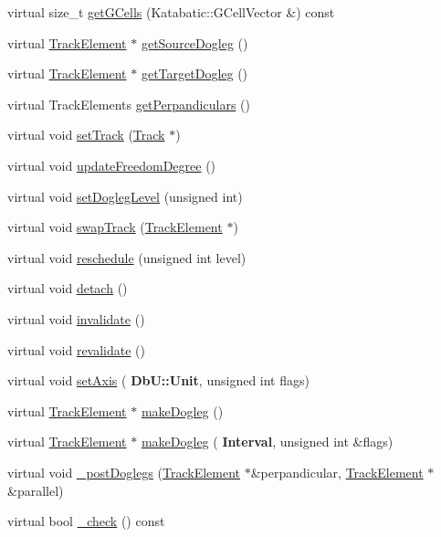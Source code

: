 \begin{DoxyCompactItemize}
\item 
virtual size\+\_\+t \hyperlink{classKite_1_1TrackSegment_af45301f76558f613ccb605a8f851080e}{get\+G\+Cells} (Katabatic\+::\+G\+Cell\+Vector \&) const
\item 
virtual \hyperlink{classKite_1_1TrackElement}{Track\+Element} $\ast$ \hyperlink{classKite_1_1TrackSegment_a7e79fbfe77f173d46b1959c41087930a}{get\+Source\+Dogleg} ()
\item 
virtual \hyperlink{classKite_1_1TrackElement}{Track\+Element} $\ast$ \hyperlink{classKite_1_1TrackSegment_aeb4e39bd925d093e6c45599433bb421c}{get\+Target\+Dogleg} ()
\item 
virtual Track\+Elements \hyperlink{classKite_1_1TrackSegment_aa0ba92ebf19f596537dc051c090d5736}{get\+Perpandiculars} ()
\item 
virtual void \hyperlink{classKite_1_1TrackSegment_abd3d8093f871d3d1a7f24b053648026c}{set\+Track} (\hyperlink{classKite_1_1Track}{Track} $\ast$)
\item 
virtual void \hyperlink{classKite_1_1TrackSegment_af5332d647c0482aa90ad7cc9b2a50f3a}{update\+Freedom\+Degree} ()
\item 
virtual void \hyperlink{classKite_1_1TrackSegment_a2b90319cb042b283aa5d1fdb1992f11f}{set\+Dogleg\+Level} (unsigned int)
\item 
virtual void \hyperlink{classKite_1_1TrackSegment_acc245ce084989d1c34816d0e61b9d510}{swap\+Track} (\hyperlink{classKite_1_1TrackElement}{Track\+Element} $\ast$)
\item 
virtual void \hyperlink{classKite_1_1TrackSegment_a0ffe603ec7d46f21f5e56ccbe84c03fb}{reschedule} (unsigned int level)
\item 
virtual void \hyperlink{classKite_1_1TrackSegment_ac295bade8aee589f6718dfa79edc2a34}{detach} ()
\item 
virtual void \hyperlink{classKite_1_1TrackSegment_a893f1101c650c08c98612515c2b1a89c}{invalidate} ()
\item 
virtual void \hyperlink{classKite_1_1TrackSegment_a5bd93abe1416952ace15a98dbeeed124}{revalidate} ()
\item 
virtual void \hyperlink{classKite_1_1TrackSegment_a262a915c38127d3722ec561b30d80f91}{set\+Axis} (\textbf{ Db\+U\+::\+Unit}, unsigned int flags)
\item 
virtual \hyperlink{classKite_1_1TrackElement}{Track\+Element} $\ast$ \hyperlink{classKite_1_1TrackSegment_a7a9637875364e84e6862de0102341715}{make\+Dogleg} ()
\item 
virtual \hyperlink{classKite_1_1TrackElement}{Track\+Element} $\ast$ \hyperlink{classKite_1_1TrackSegment_a524f1569b2f2c1a84df2fe47e84e28ed}{make\+Dogleg} (\textbf{ Interval}, unsigned int \&flags)
\item 
virtual void \hyperlink{classKite_1_1TrackSegment_a10a45c049d0bd7d01c7eff1c5441c7a2}{\+\_\+post\+Doglegs} (\hyperlink{classKite_1_1TrackElement}{Track\+Element} $\ast$\&perpandicular, \hyperlink{classKite_1_1TrackElement}{Track\+Element} $\ast$\&parallel)
\item 
virtual bool \hyperlink{classKite_1_1TrackSegment_ad79f4c6ea0fe1135b8264a29af085909}{\+\_\+check} () const
\end{DoxyCompactItemize}
